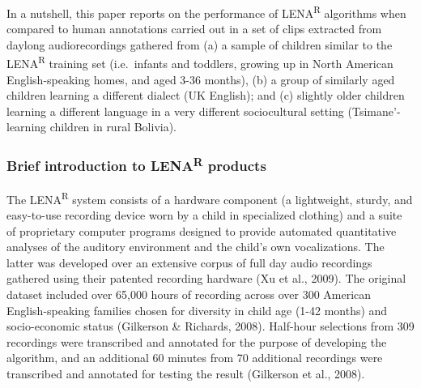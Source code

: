 \documentclass[english,table,man,floatsintext]{apa6}
\begin{document}
In a nutshell, this paper reports on the performance of LENA\textsuperscript{R} algorithms when compared to human annotations carried out in a set of clips extracted from daylong audiorecordings gathered from (a) a sample of children similar to the LENA\textsuperscript{R} training set (i.e.~infants and toddlers, growing up in North American English-speaking homes, and aged 3-36 months), (b) a group of similarly aged children learning a different dialect (UK English); and (c) slightly older children learning a different language in a very different sociocultural setting (Tsimane'-learning children in rural Bolivia).

\hypertarget{brief-introduction-to-lenar-products}{%
\subsubsection{\texorpdfstring{Brief introduction to LENA\textsuperscript{R} products}{Brief introduction to LENAR products}}\label{brief-introduction-to-lenar-products}}

The LENA\textsuperscript{R} system consists of a hardware component (a lightweight, sturdy, and easy-to-use recording device worn by a child in specialized clothing) and a suite of proprietary computer programs designed to provide automated quantitative analyses of the auditory environment and the child's own vocalizations. The latter was developed over an extensive corpus of full day audio recordings gathered using their patented recording hardware (Xu et al., 2009). The original dataset included over 65,000 hours of recording across over 300 American English-speaking families chosen for diversity in child age (1-42 months) and socio-economic status (Gilkerson \& Richards, 2008). Half-hour selections from 309 recordings were transcribed and annotated for the purpose of developing the algorithm, and an additional 60 minutes from 70 additional recordings were transcribed and annotated for testing the result (Gilkerson et al., 2008).
\end{document}

